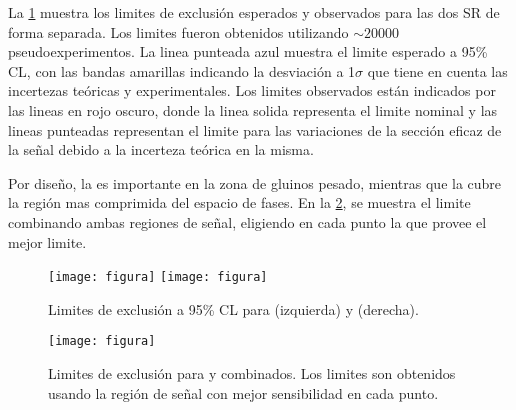 La \cref{fig:limit_SR_toys} muestra los limites de exclusión
esperados y observados para las dos SR de forma separada. Los limites
fueron obtenidos utilizando $\sim 20000$ pseudoexperimentos. La linea
punteada azul muestra el limite esperado a 95\% CL, con las bandas
amarillas indicando la desviación a 1$\sigma$ que tiene en cuenta
las incertezas teóricas y experimentales.
Los limites observados están indicados por las lineas en rojo oscuro,
donde la linea solida representa el limite nominal y las lineas
punteadas representan el limite para las variaciones de la sección
eficaz de la señal debido a la incerteza teórica en la misma.


Por diseño, la {\SRL} es importante en la zona de gluinos pesado,
mientras que la {\SRH} cubre la región mas comprimida del espacio
de fases. En la \cref{fig:limit_SR_combined_toys}, se muestra
el limite combinando ambas regiones de señal, eligiendo en cada punto
la que provee el mejor limite.


\begin{figure}[!htbp]
  \centering

  \texttt{[image: figura]} %
  \texttt{[image: figura]} %

  \caption{Limites de exclusión a 95\% CL para {\SRL}  (izquierda) y {\SRH} (derecha).}
  \label{fig:limit_SR_toys}
\end{figure}


\begin{figure}[!htbp]
  \centering

  \texttt{[image: figura]}

  \caption{Limites de exclusión para {\SRL} y {\SRH} combinados.
    Los limites son obtenidos usando la región de señal con mejor sensibilidad
    en cada punto.}
  \label{fig:limit_SR_combined_toys}

\end{figure}




